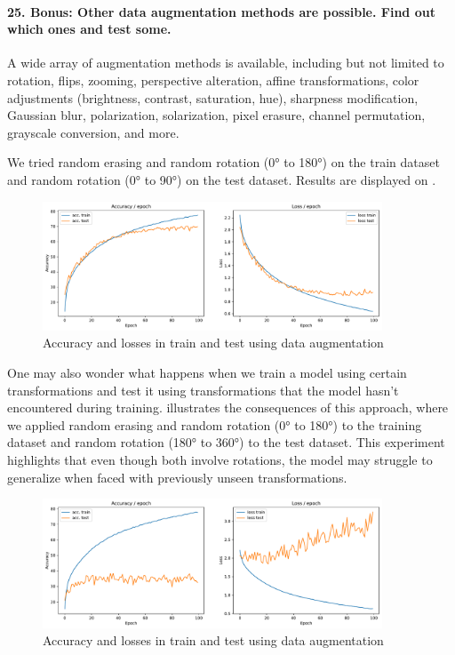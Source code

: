 \paragraph{25. Bonus: Other data augmentation methods are possible. Find out which ones and test some.}
A wide array of augmentation methods is available, including but not limited to rotation, flips, zooming, perspective alteration, affine transformations, color adjustments (brightness, contrast, saturation, hue), sharpness modification, Gaussian blur, polarization, solarization, pixel erasure, channel permutation, grayscale conversion, and more.

We tried random erasing and random rotation (0° to 180°) on the train dataset and random rotation (0° to 90°) on the test dataset. Results are displayed on .

\begin{figure}[H]
    \centering
    \includegraphics*[width=0.9\textwidth]{figs/CNN/dataincrease_rotation.pdf}
    \caption{Accuracy and losses in train and test using data augmentation}
    \label{fig:dataincrease_rotation}
\end{figure}

One may also wonder what happens when we train a model using certain transformations and test it using transformations that the model hasn't encountered during training.  illustrates the consequences of this approach, where we applied random erasing and random rotation (0° to 180°) to the training dataset and random rotation (180° to 360°) to the test dataset. This experiment highlights that even though both involve rotations, the model may struggle to generalize when faced with previously unseen transformations.

\begin{figure}[H]
    \centering
    \includegraphics*[width=0.9\textwidth]{figs/CNN/dataincrease_bis.pdf}
    \caption{Accuracy and losses in train and test using data augmentation}
    \label{fig:dataincrease_bis}
\end{figure}

